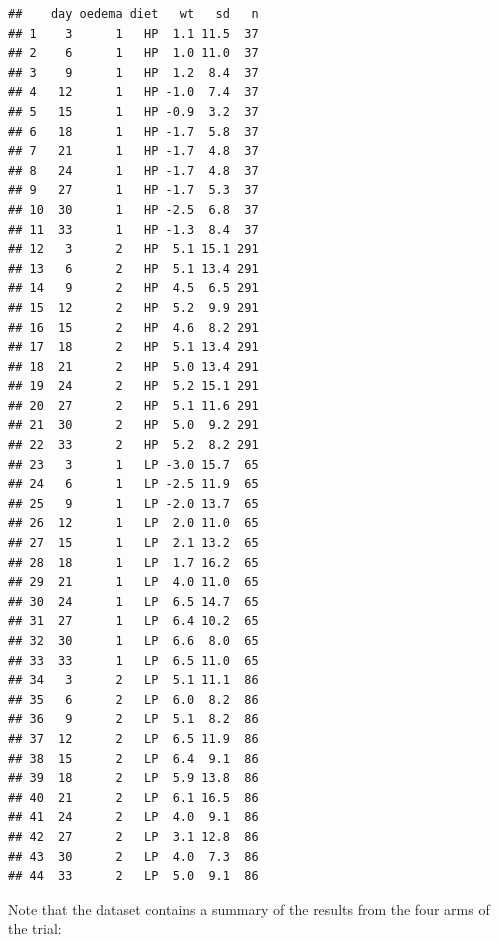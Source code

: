 \documentclass[12pt,a4paper]{book}
\theoremstyle{definition}
\theoremstyle{definition}
\theoremstyle{definition}
\theoremstyle{remark}
\begin{document}
\begin{verbatim}
##    day oedema diet   wt   sd   n
## 1    3      1   HP  1.1 11.5  37
## 2    6      1   HP  1.0 11.0  37
## 3    9      1   HP  1.2  8.4  37
## 4   12      1   HP -1.0  7.4  37
## 5   15      1   HP -0.9  3.2  37
## 6   18      1   HP -1.7  5.8  37
## 7   21      1   HP -1.7  4.8  37
## 8   24      1   HP -1.7  4.8  37
## 9   27      1   HP -1.7  5.3  37
## 10  30      1   HP -2.5  6.8  37
## 11  33      1   HP -1.3  8.4  37
## 12   3      2   HP  5.1 15.1 291
## 13   6      2   HP  5.1 13.4 291
## 14   9      2   HP  4.5  6.5 291
## 15  12      2   HP  5.2  9.9 291
## 16  15      2   HP  4.6  8.2 291
## 17  18      2   HP  5.1 13.4 291
## 18  21      2   HP  5.0 13.4 291
## 19  24      2   HP  5.2 15.1 291
## 20  27      2   HP  5.1 11.6 291
## 21  30      2   HP  5.0  9.2 291
## 22  33      2   HP  5.2  8.2 291
## 23   3      1   LP -3.0 15.7  65
## 24   6      1   LP -2.5 11.9  65
## 25   9      1   LP -2.0 13.7  65
## 26  12      1   LP  2.0 11.0  65
## 27  15      1   LP  2.1 13.2  65
## 28  18      1   LP  1.7 16.2  65
## 29  21      1   LP  4.0 11.0  65
## 30  24      1   LP  6.5 14.7  65
## 31  27      1   LP  6.4 10.2  65
## 32  30      1   LP  6.6  8.0  65
## 33  33      1   LP  6.5 11.0  65
## 34   3      2   LP  5.1 11.1  86
## 35   6      2   LP  6.0  8.2  86
## 36   9      2   LP  5.1  8.2  86
## 37  12      2   LP  6.5 11.9  86
## 38  15      2   LP  6.4  9.1  86
## 39  18      2   LP  5.9 13.8  86
## 40  21      2   LP  6.1 16.5  86
## 41  24      2   LP  4.0  9.1  86
## 42  27      2   LP  3.1 12.8  86
## 43  30      2   LP  4.0  7.3  86
## 44  33      2   LP  5.0  9.1  86
\end{verbatim}

Note that the dataset contains a summary of the results from the four
arms of the trial:
\end{document}
